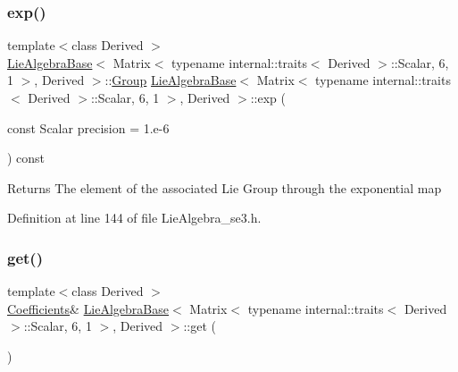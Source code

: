 \subsubsection{\texorpdfstring{exp()}{exp()}}
{\footnotesize\ttfamily template$<$class Derived $>$ \\
\hyperlink{class_lie_algebra_base}{Lie\+Algebra\+Base}$<$ Matrix$<$ typename internal\+::traits$<$ Derived $>$\+::Scalar, 6, 1 $>$, Derived $>$\+::\hyperlink{class_lie_algebra_base_3_01_matrix_3_01typename_01internal_1_1traits_3_01_derived_01_4_1_1_scala449314c781550590437697c4dc21a6d4_a578d3791e63ec84b43491f4487f0dffa}{Group} \hyperlink{class_lie_algebra_base}{Lie\+Algebra\+Base}$<$ Matrix$<$ typename internal\+::traits$<$ Derived $>$\+::Scalar, 6, 1 $>$, Derived $>$\+::exp (\begin{DoxyParamCaption}\item[{const Scalar}]{precision = {\ttfamily 1.e-\/6} }\end{DoxyParamCaption}) const\hspace{0.3cm}{\ttfamily [inline]}}

\begin{DoxyReturn}{Returns}
The element of the associated Lie Group through the exponential map 
\end{DoxyReturn}


Definition at line 144 of file Lie\+Algebra\+\_\+se3.\+h.

\hypertarget{class_lie_algebra_base_3_01_matrix_3_01typename_01internal_1_1traits_3_01_derived_01_4_1_1_scala449314c781550590437697c4dc21a6d4_a16d1e0fff92a2179f8cb4c7f86a0db64}{}\label{class_lie_algebra_base_3_01_matrix_3_01typename_01internal_1_1traits_3_01_derived_01_4_1_1_scala449314c781550590437697c4dc21a6d4_a16d1e0fff92a2179f8cb4c7f86a0db64} 
\subsubsection{\texorpdfstring{get()}{get()}\hspace{0.1cm}{\footnotesize\ttfamily [1/2]}}
{\footnotesize\ttfamily template$<$class Derived $>$ \\
\hyperlink{class_lie_algebra_base_3_01_matrix_3_01typename_01internal_1_1traits_3_01_derived_01_4_1_1_scala449314c781550590437697c4dc21a6d4_a52a52c9b33e2ec0441866069e20473ab}{Coefficients}\& \hyperlink{class_lie_algebra_base}{Lie\+Algebra\+Base}$<$ Matrix$<$ typename internal\+::traits$<$ Derived $>$\+::Scalar, 6, 1 $>$, Derived $>$\+::get (\begin{DoxyParamCaption}{ }\end{DoxyParamCaption})\hspace{0.3cm}{\ttfamily [inline]}}

